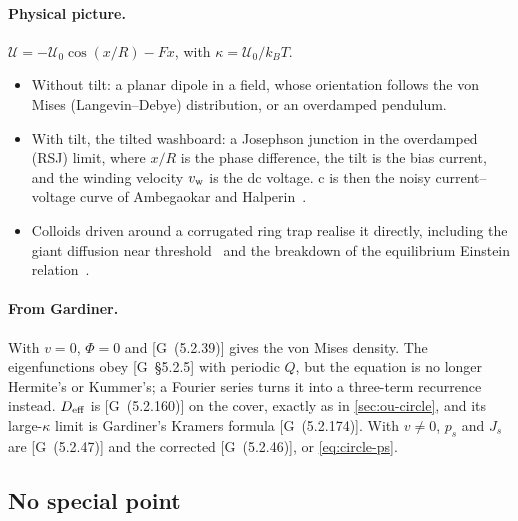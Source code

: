 \documentclass[11pt]{article}
\numberwithin{equation}{section}
\newcommand{\G}[1]{[G~(#1)]}
\newcommand{\Gs}[1]{[G~\S#1]}
\begin{document}
\paragraph{Physical picture.} $\mathcal U=-\mathcal U_0\cos(x/R)-Fx$, with $\kappa=\mathcal U_0/k_BT$.
\begin{itemize}
  \item Without tilt: a planar dipole in a field, whose orientation follows the von Mises (Langevin--Debye)
        distribution, or an overdamped pendulum.
  \item With tilt, the tilted washboard: a Josephson junction in the overdamped (RSJ) limit, where $x/R$ is the
        phase difference, the tilt is the bias current, and the winding velocity $v_{\rm w}$ is the dc voltage.
        c is then the noisy current--voltage curve of Ambegaokar and Halperin~\cite{ambegaokar}.
  \item Colloids driven around a corrugated ring trap realise it directly, including the giant diffusion near
        threshold~\cite{leegrier} and the breakdown of the equilibrium Einstein relation~\cite{blickle}.
\end{itemize}

\paragraph{From Gardiner.} With $v=0$, $\Phi=0$ and \G{5.2.39} gives the von Mises density. The eigenfunctions
obey \Gs{5.2.5} with periodic $Q$, but the equation is no longer Hermite's or Kummer's; a Fourier series turns
it into a three-term recurrence instead. $D_{\rm eff}$ is \G{5.2.160} on the cover, exactly as in
\cref{sec:ou-circle}, and its large-$\kappa$ limit is Gardiner's Kramers formula \G{5.2.174}. With $v\neq0$,
$p_s$ and $J_s$ are \G{5.2.47} and the corrected \G{5.2.46}, or \cref{eq:circle-ps}.

\subsection{No special point}
\end{document}
